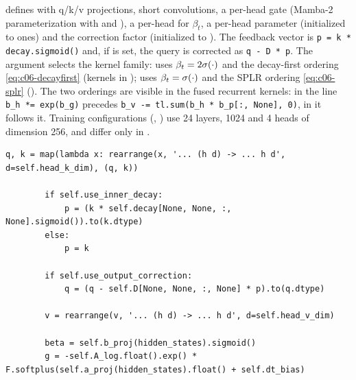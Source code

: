 \begin{implnote}[title={In the code: the official repository}]
 defines  with
q/k/v projections, short convolutions, a per-head gate  (Mamba-2
parameterization with  and ), a per-head  for
$\beta_t$, a per-head parameter  (initialized to ones) and the correction factor
 (initialized to ). The feedback vector is \texttt{p = k * decay.sigmoid()}
and, if  is set, the query is corrected as \texttt{q - D * p}. The argument
 selects the kernel family:  uses $\beta_t=2\sigma(\cdot)$ and the
decay-first ordering \eqref{eq:c06-decayfirst} (kernels in
);  uses $\beta_t=\sigma(\cdot)$ and the SPLR
ordering \eqref{eq:c06-splr} (). The two orderings are visible
in the fused recurrent kernels: in  the line
\texttt{b\_h *= exp(b\_g)} precedes \texttt{b\_v -= tl.sum(b\_h * b\_p[:, None], 0)}, in
 it follows it. Training configurations
(, ) use 24 layers,
 1024 and 4 heads of dimension 256, and differ only in .
\end{implnote}

\begin{lstlisting}[caption={Excerpt from \texttt{repos/\allowbreak{}fla-org\_\_flash-linear-attention/\allowbreak{}fla/\allowbreak{}layers/\allowbreak{}comba.py}},label={lst:c06-comba-fla}]
        q, k = map(lambda x: rearrange(x, '... (h d) -> ... h d', d=self.head_k_dim), (q, k))

        if self.use_inner_decay:
            p = (k * self.decay[None, None, :, None].sigmoid()).to(k.dtype)
        else:
            p = k

        if self.use_output_correction:
            q = (q - self.D[None, None, :, None] * p).to(q.dtype)

        v = rearrange(v, '... (h d) -> ... h d', d=self.head_v_dim)

        beta = self.b_proj(hidden_states).sigmoid()
        g = -self.A_log.float().exp() * F.softplus(self.a_proj(hidden_states).float() + self.dt_bias)
\end{lstlisting}

